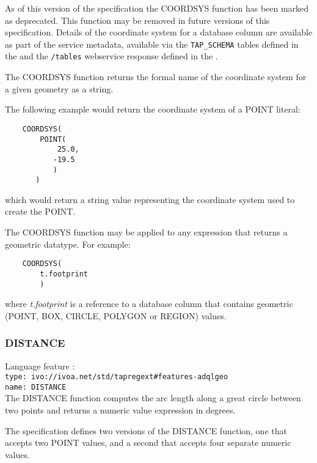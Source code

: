 \documentclass[11pt,a4paper]{ivoa}
\begin{document}
As of this version of the specification the COORDSYS function has
been marked as deprecated. This function may be removed in future versions
of this specification.
Details of the coordinate system for a database column are available as part of
the service metadata, available via the \verb:TAP_SCHEMA: tables defined in the
\TAPSpec{} and the \verb:/tables: webservice response defined in the \VOSISpec{}.


The COORDSYS function returns the formal name of the coordinate system for
a given geometry as a string.

The following example would return the coordinate system of a POINT literal:
\begin{verbatim}
    COORDSYS(
        POINT(
            25.0,
           -19.5
           )
       )
\end{verbatim}
\noindent
which would return a string value representing the coordinate system used
to create the POINT.

The COORDSYS function may be applied to any expression that returns a
geometric datatype. For example:
\begin{verbatim}
    COORDSYS(
        t.footprint
        )
\end{verbatim}
\noindent
where \textit{t.footprint} is a reference to a database column that
contains geometric (POINT, BOX, CIRCLE, POLYGON or REGION) values.

\subsubsection{DISTANCE}
\label{sec:functions.geom.distance}
{\footnotesize Language feature :}\\
{\footnotesize \verb|type: ivo://ivoa.net/std/tapregext#features-adqlgeo|}\\
{\footnotesize \verb|name: DISTANCE|}\\

The DISTANCE function computes the arc length along a great circle between two
points and returns a numeric value expression in degrees.

The specification defines two versions of the DISTANCE function, one that
accepts two POINT values, and a second that accepts four separate numeric
values.
\end{document}
